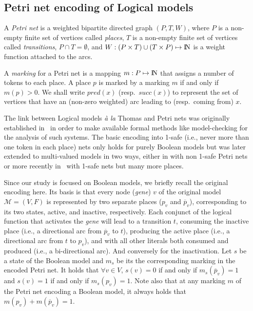 \documentclass[runningheads]{llncs}
\newcommand{\vangiang}[1]{\textcolor{magenta}{#1}}
\begin{document}

\subsection{Petri net encoding of Logical models}
\label{sec:encoding}

\begin{definition}

  A \emph{Petri net} is a weighted bipartite directed graph \((P, T, W)\),
  where \(P\) is a non-empty finite set of vertices called \emph{places},
  \(T\) is a non-empty finite set of vertices called \emph{transitions},
  \(P \cap T = \emptyset\),
  and \(W : (P \times T) \cup (T \times P) \mapsto {\rm I\!N} \) is a weight function attached to the arcs.

\end{definition}
A \emph{marking} for a Petri net is a mapping \(m : P \mapsto {\rm I\!N}\) that assigns a number of tokens to each place. A place \(p\) is marked by a marking \(m\) if and only if \(m(p) > 0\). We shall write \(pred(x)\) (resp.\ \(succ(x)\)) to represent the set of vertices that have an (non-zero weighted) arc leading to (resp.\ coming from) \(x\).

The link between Logical models \emph{à la} Thomas and Petri nets was originally established in~\cite{chaouiya2004qualitative} in order to make available formal methods like model-checking for the analysis of such systems.
The basic encoding into 1-safe (i.e., never more than one token in each place) nets only holds for purely Boolean models but was later extended to multi-valued models in two ways, either in \cite{chaouiya2011petri} with non 1-safe Petri nets or more recently in~\cite{chatain2014characterization} with 1-safe nets but many more places.

Since our study is focused on Boolean models, we briefly recall the original encoding here.
Its basis is that every node (\emph{gene}) \(v\) of the original model \(\mathcal{M} = (V, F)\) is represented by two separate places (\(p_v\) and \(\overline{p}_v\)), corresponding to its two states, active, and inactive, respectively.
Each conjunct of the logical function that activates the \emph{gene} will lead to a transition \(t\), consuming the inactive place (i.e., a directional arc from \(\overline{p}_v\) to \(t\)), producing the active place (i.e., a directional arc from \(t\) to \(p_v\)), and with all other literals both consumed and produced (i.e., a bi-directional arc).
And conversely for the inactivation. 
Let \(s\) be a state of the Boolean model and \(m_s\) be its the corresponding marking in the encoded Petri net. It holds that \(\forall v \in V\), \(s(v) = 0\) if and only if \(m_s(\overline{p}_v) = 1\) and \(s(v) = 1\) if and only if \(m_s(p_v) = 1\). Note also that at any marking \(m\) of the Petri net encoding a Boolean model, it always holds that \(m(p_v) + m(\overline{p}_v) = 1\).
\end{document}
